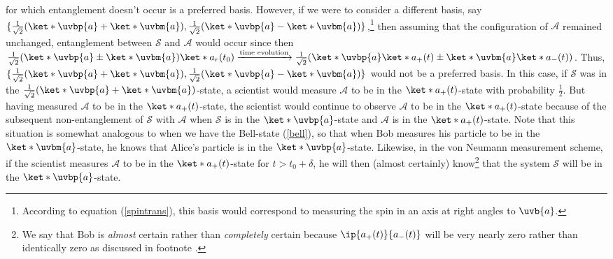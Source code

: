 \documentclass[12pt]{report}
\begin{document}
    for which entanglement doesn't occur is a preferred basis. However, if we were to consider a different basis, say $\{\frac{1}{\sqrt{2}}(\ket*{\uvbp{a}}+\ket*{\uvbm{a}}), \frac{1}{\sqrt{2}}(\ket*{\uvbp{a}}-\ket*{\uvbm{a}})\}$,\footnote{According to equation (\ref{spintrans}), this basis would correspond to measuring the spin in an axis at right angles to 
    $\uvb{a}$.} then assuming that the configuration of $\mathcal{A}$ remained unchanged, entanglement between $\mathcal{S}$ and $\mathcal{A}$ would occur since then 
    $\frac{1}{\sqrt{2}}(\ket*{\uvbp{a}}\pm\ket*{\uvbm{a}})\ket*{a_r(t_0)}\xrightarrow{\text{time evolution}}\frac{1}{\sqrt{2}}(\ket*{\uvbp{a}}\ket*{a_+(t)}\pm\ket*{\uvbm{a}}\ket*{a_-(t)})$. Thus, $\{\frac{1}{\sqrt{2}}(\ket*{\uvbp{a}}+\ket*{\uvbm{a}}), \frac{1}{\sqrt{2}}(\ket*{\uvbp{a}}-\ket*{\uvbm{a}})\}$ would not be a preferred basis. In this case, if  $\mathcal{S}$ was in the $\frac{1}{\sqrt{2}}(\ket*{\uvbp{a}}+\ket*{\uvbm{a}})$-state, a scientist would measure $\mathcal{A}$ to be in the $\ket*{a_+(t)}$-state with probability $\frac{1}{2}$. But having measured $\mathcal{A}$ to be in the $\ket*{a_+(t)}$-state, the scientist would continue to observe $\mathcal{A}$ to be in the $\ket*{a_+(t)}$-state because of the subsequent non-entanglement of $\mathcal{S}$ with $\mathcal{A}$ when $\mathcal{S}$ is in the   $\ket*{\uvbp{a}}$-state and $\mathcal{A}$ is in the $\ket*{a_+(t)}$-state. Note that this situation is somewhat analogous to when we have the Bell-state (\ref{bell}), so that when Bob measures his particle to be in the $\ket*{\uvbm{a}}$-state, he knows that Alice's particle is in the $\ket*{\uvbp{a}}$-state. Likewise, in the von Neumann measurement scheme, if the scientist measures $\mathcal{A}$ to be in the $\ket*{a_+(t)}$-state for $t>t_0+\delta$, he will then (almost certainly) know\footnote{We say that Bob is \emph{almost} certain rather than \emph{completely} certain because $\ip{a_+(t)}{a_-(t)}$ will be very nearly zero rather than identically zero as discussed in footnote .} that the system $\mathcal{S}$ will be in the $\ket*{\uvbp{a}}$-state.
\end{document}
